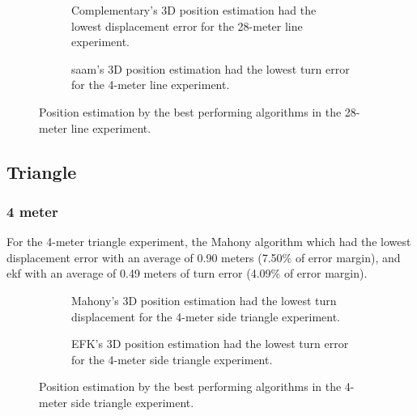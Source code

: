 \begin{figure}[H]
    \centering
    \begin{subfigure}{0.49\textwidth}
        \centering
        \resizebox{1\linewidth}{!}{}
        \caption{Complementary's 3D position estimation had the lowest displacement error for the 28-meter line experiment.}
        \label{fig:line28_2D}
    \end{subfigure}
    \begin{subfigure}{0.49\textwidth}
        \centering
        \resizebox{1\linewidth}{!}{}
        \caption{\acrshort{saam}'s 3D position estimation had the lowest turn error for the 4-meter line experiment.}
        \label{fig:line28_3D}
    \end{subfigure}
    \caption{Position estimation by the best performing algorithms in the 28-meter line experiment.}
    \label{fig:line28}
\end{figure}

\subsection{Triangle}


\subsubsection{4 meter}

For the 4-meter triangle experiment, the Mahony algorithm which had the lowest displacement error with an average of 0.90  meters (7.50\% of error margin), and \acrshort{ekf} with an average of 0.49 meters of turn error (4.09\% of error margin).

\vspace{-0.5cm}

\vspace{-1.5cm}

\begin{figure}[H]
    \centering
    \begin{subfigure}{0.49\textwidth}
        \centering
        \resizebox{1\linewidth}{!}{}
        \caption{Mahony's 3D position estimation had the lowest turn displacement for the 4-meter side triangle experiment.}
        \label{fig:triangle4_2D}
    \end{subfigure}
    \begin{subfigure}{0.49\textwidth}
        \centering
        \resizebox{1\linewidth}{!}{}
        \caption{EFK's 3D position estimation had the lowest turn error for the 4-meter side triangle experiment.}
        \label{fig:triangle4_3D}
    \end{subfigure}
    \caption{Position estimation by the best performing algorithms in the 4-meter side triangle experiment.}
    \label{fig:triangle4}
\end{figure}

